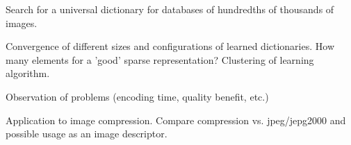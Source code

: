 Search for a universal dictionary for databases of hundredths of thousands of images.

Convergence of different sizes and configurations of learned dictionaries.
How many elements for a 'good' sparse representation?
Clustering of learning algorithm.

Observation of problems (encoding time, quality benefit, etc.)

Application to image compression.
Compare compression vs. jpeg/jepg2000 and possible usage as an image descriptor.






